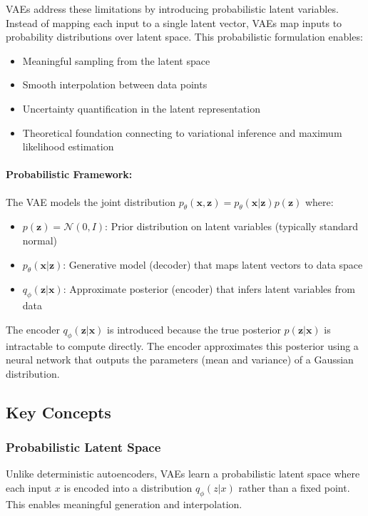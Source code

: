 \documentclass[conference]{IEEEtran}
\begin{document}
VAEs address these limitations by introducing probabilistic latent variables. Instead of mapping each input to a single latent vector, VAEs map inputs to probability distributions over latent space. This probabilistic formulation enables:
\begin{itemize}
    \item Meaningful sampling from the latent space
    \item Smooth interpolation between data points
    \item Uncertainty quantification in the latent representation
    \item Theoretical foundation connecting to variational inference and maximum likelihood estimation
\end{itemize}

\paragraph{Probabilistic Framework:}
The VAE models the joint distribution $p_\theta(\mathbf{x}, \mathbf{z}) = p_\theta(\mathbf{x}|\mathbf{z})p(\mathbf{z})$ where:
\begin{itemize}
    \item $p(\mathbf{z}) = \mathcal{N}(0, I)$: Prior distribution on latent variables (typically standard normal)
    \item $p_\theta(\mathbf{x}|\mathbf{z})$: Generative model (decoder) that maps latent vectors to data space
    \item $q_\phi(\mathbf{z}|\mathbf{x})$: Approximate posterior (encoder) that infers latent variables from data
\end{itemize}

The encoder $q_\phi(\mathbf{z}|\mathbf{x})$ is introduced because the true posterior $p(\mathbf{z}|\mathbf{x})$ is intractable to compute directly. The encoder approximates this posterior using a neural network that outputs the parameters (mean and variance) of a Gaussian distribution.

\subsection{Key Concepts}

\subsubsection{Probabilistic Latent Space}

Unlike deterministic autoencoders, VAEs learn a probabilistic latent space where each input $x$ is encoded into a distribution $q_\phi(z|x)$ rather than a fixed point. This enables meaningful generation and interpolation.
\end{document}
